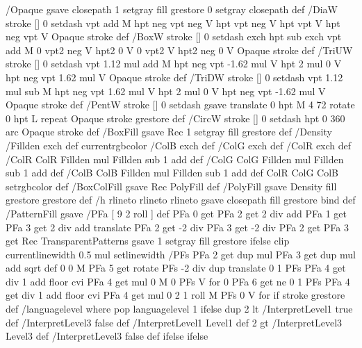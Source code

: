 /Opaque {gsave closepath 1 setgray fill grestore 0 setgray closepath} def
/DiaW {stroke [] 0 setdash vpt add M
  hpt neg vpt neg V hpt vpt neg V
  hpt vpt V hpt neg vpt V Opaque stroke} def
/BoxW {stroke [] 0 setdash exch hpt sub exch vpt add M
  0 vpt2 neg V hpt2 0 V 0 vpt2 V
  hpt2 neg 0 V Opaque stroke} def
/TriUW {stroke [] 0 setdash vpt 1.12 mul add M
  hpt neg vpt -1.62 mul V
  hpt 2 mul 0 V
  hpt neg vpt 1.62 mul V Opaque stroke} def
/TriDW {stroke [] 0 setdash vpt 1.12 mul sub M
  hpt neg vpt 1.62 mul V
  hpt 2 mul 0 V
  hpt neg vpt -1.62 mul V Opaque stroke} def
/PentW {stroke [] 0 setdash gsave
  translate 0 hpt M 4 {72 rotate 0 hpt L} repeat
  Opaque stroke grestore} def
/CircW {stroke [] 0 setdash 
  hpt 0 360 arc Opaque stroke} def
/BoxFill {gsave Rec 1 setgray fill grestore} def
/Density {
  /Fillden exch def
  currentrgbcolor
  /ColB exch def /ColG exch def /ColR exch def
  /ColR ColR Fillden mul Fillden sub 1 add def
  /ColG ColG Fillden mul Fillden sub 1 add def
  /ColB ColB Fillden mul Fillden sub 1 add def
  ColR ColG ColB setrgbcolor} def
/BoxColFill {gsave Rec PolyFill} def
/PolyFill {gsave Density fill grestore grestore} def
/h {rlineto rlineto rlineto gsave closepath fill grestore} bind def
%
%
/PatternFill {gsave /PFa [ 9 2 roll ] def
  PFa 0 get PFa 2 get 2 div add PFa 1 get PFa 3 get 2 div add translate
  PFa 2 get -2 div PFa 3 get -2 div PFa 2 get PFa 3 get Rec
  TransparentPatterns {} {gsave 1 setgray fill grestore} ifelse
  clip
  currentlinewidth 0.5 mul setlinewidth
  /PFs PFa 2 get dup mul PFa 3 get dup mul add sqrt def
  0 0 M PFa 5 get rotate PFs -2 div dup translate
  0 1 PFs PFa 4 get div 1 add floor cvi
	{PFa 4 get mul 0 M 0 PFs V} for
  0 PFa 6 get ne {
	0 1 PFs PFa 4 get div 1 add floor cvi
	{PFa 4 get mul 0 2 1 roll M PFs 0 V} for
 } if
  stroke grestore} def
%
/languagelevel where
 {pop languagelevel} {1} ifelse
dup 2 lt
	{/InterpretLevel1 true def
	 /InterpretLevel3 false def}
	{/InterpretLevel1 Level1 def
	 2 gt
	    {/InterpretLevel3 Level3 def}
	    {/InterpretLevel3 false def}
	 ifelse }
 ifelse
%
%
